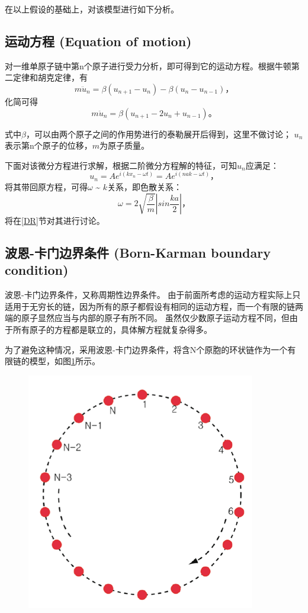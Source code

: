 \documentclass[declarePage]{ecnuthesis}
\begin{document}
在以上假设的基础上，对该模型进行如下分析。

\subsection{运动方程 (Equation of motion)}

对一维单原子链中第n个原子进行受力分析，即可得到它的运动方程。根据牛顿第二定律和胡克定律，有
\begin{equation}
    m \ddot{u}_n = \beta (u_{n+1} - u_n) - \beta (u_n - u_{n-1}) \text{，}
\end{equation}
化简可得
\begin{equation}
    m \ddot{u}_n = \beta (u_{n+1} - 2u_n + u_{n-1}) \text{。}
\end{equation}

式中$\beta$，可以由两个原子之间的作用势进行的泰勒展开后得到，这里不做讨论；%
$u_n$表示第n个原子的位移，$m$为原子质量。

下面对该微分方程进行求解，根据二阶微分方程解的特征，可知$u_n$应满足：
\begin{equation}
    u_n = A e^{i(kx_n - \omega t)} = A e^{i(nak - \omega t)} \text{，}
\end{equation}
将其带回原方程，可得$\omega$ \~{} $k$关系，即色散关系：
\begin{equation}
    \omega = 2 \sqrt{\frac{\beta}{m}} \left | sin \frac{ka}{2} \right | \text{，}
\end{equation}
将在\ref{DR}节对其进行讨论。

\subsection{波恩-卡门边界条件 (Born-Karman boundary condition)}
波恩-卡门边界条件，又称周期性边界条件。%
由于前面所考虑的运动方程实际上只适用于无穷长的链，因为所有的原子都假设有相同的运动方程，而一个有限的链两端的原子显然应当与内部的原子有所不同。%
虽然仅少数原子运动方程不同，但由于所有原子的方程都是联立的，具体解方程就复杂得多。

为了避免这种情况，采用波恩-卡门边界条件，将含N个原胞的环状链作为一个有限链的模型，如图\ref{BKBC}所示。
\begin{figure}[htb]
    \centering
    \includegraphics[width=.5\textwidth]{BKBC.png}
    \label{BKBC}
\end{figure}
\end{document}
